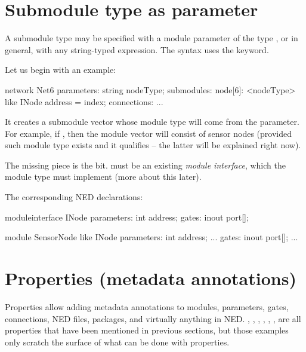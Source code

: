 \section{Submodule type as parameter}
\label{sec:ch-ned-lang:submodule-like}

A submodule type may be specified with a module parameter of the type
, or in general, with any string-typed expression.
The syntax uses the  keyword.

Let us begin with an example:

\begin{ned}
network Net6
{
    parameters:
        string nodeType;
    submodules:
        node[6]: <nodeType> like INode {
            address = index;
        }
    connections:
        ...
}
\end{ned}

It creates a submodule vector whose module type will come from the
 parameter. For example, if ,
then the module vector will consist of sensor nodes (provided such module
type exists and it qualifies -- the latter will be explained right now).

The missing piece is the  bit.  must be
an existing \textit{module interface}, which the 
module type must implement (more about this later).

The corresponding NED declarations:

\begin{ned}
moduleinterface INode
{
    parameters:
        int address;
    gates:
        inout port[];
}
\end{ned}

\begin{ned}
module SensorNode like INode
{
    parameters:
        int address;
        ...
    gates:
        inout port[];
        ...
}
\end{ned}



\section{Properties (metadata annotations)}
\label{sec:ch-ned-lang:properties}

Properties allow adding metadata annotations to modules, parameters, gates,
connections, NED files, packages, and virtually anything in NED.
, , , , ,
,  are all properties that have been mentioned in
previous sections, but those examples only scratch the surface of what can
be done with properties.

